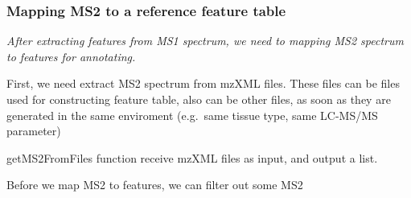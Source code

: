 \documentclass[
]{article}
\newenvironment{Shaded}{\begin{snugshade}}{\end{snugshade}}
\newcommand{\CommentTok}[1]{\textcolor[rgb]{0.56,0.35,0.01}{\textit{#1}}}
\newcommand{\DataTypeTok}[1]{\textcolor[rgb]{0.13,0.29,0.53}{#1}}
\newcommand{\DecValTok}[1]{\textcolor[rgb]{0.00,0.00,0.81}{#1}}
\newcommand{\KeywordTok}[1]{\textcolor[rgb]{0.13,0.29,0.53}{\textbf{#1}}}
\newcommand{\NormalTok}[1]{#1}
\newcommand{\OtherTok}[1]{\textcolor[rgb]{0.56,0.35,0.01}{#1}}
\newcommand{\StringTok}[1]{\textcolor[rgb]{0.31,0.60,0.02}{#1}}
\begin{document}
\hypertarget{mapping-ms2-to-a-reference-feature-table}{%
\subsubsection{Mapping MS2 to a reference feature
table}\label{mapping-ms2-to-a-reference-feature-table}}

\emph{After extracting features from MS1 spectrum, we need to mapping
MS2 spectrum to features for annotating.}

First, we need extract MS2 spectrum from mzXML files. These files can be
files used for constructing feature table, also can be other files, as
soon as they are generated in the same enviroment (e.g.~same tissue
type, same LC-MS/MS parameter)

getMS2FromFiles function receive mzXML files as input, and output a
list.

\begin{Shaded}
\end{Shaded}

Before we map MS2 to features, we can filter out some MS2
\end{document}
